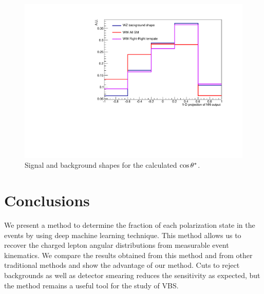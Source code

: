 \begin{figure}
\includegraphics[width=.45\textwidth]{./fig/sig_bkg.pdf}
\caption{\label{sig_bkg} Signal and background shapes for the calculated $ \cos \theta^{*}  $.}

\end{figure}

\section{Conclusions}
We present a method to determine the fraction of each polarization state in the \ssWW events by using deep machine learning technique. 
This method allows us to recover the charged lepton angular distributions from measurable event kinematics. 
We compare the results obtained from this method and from other traditional methods and show the advantage of our method. 
Cuts to reject backgrounds as well as detector smearing reduces the sensitivity as expected, but the method remains a useful tool
for the study of VBS.

\begin{thebibliography}{99}

\end{thebibliography}

